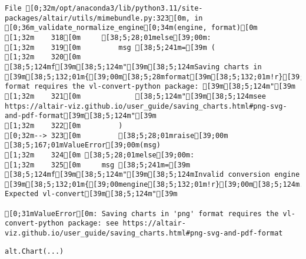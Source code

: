 \documentclass[
  letterpaper,
  DIV=11,
  numbers=noendperiod]{scrartcl}
\begin{document}
\begin{verbatim}
File [0;32m/opt/anaconda3/lib/python3.11/site-packages/altair/utils/mimebundle.py:323[0m, in [0;36m_validate_normalize_engine[0;34m(engine, format)[0m
[1;32m    318[0m     [38;5;28;01melse[39;00m:
[1;32m    319[0m         msg [38;5;241m=[39m (
[1;32m    320[0m             [38;5;124mf[39m[38;5;124m"[39m[38;5;124mSaving charts in [39m[38;5;132;01m{[39;00m[38;5;28mformat[39m[38;5;132;01m!r}[39;00m[38;5;124m format requires the vl-convert-python package: [39m[38;5;124m"[39m
[1;32m    321[0m             [38;5;124m"[39m[38;5;124msee https://altair-viz.github.io/user_guide/saving_charts.html#png-svg-and-pdf-format[39m[38;5;124m"[39m
[1;32m    322[0m         )
[0;32m--> 323[0m         [38;5;28;01mraise[39;00m [38;5;167;01mValueError[39;00m(msg)
[1;32m    324[0m [38;5;28;01melse[39;00m:
[1;32m    325[0m     msg [38;5;241m=[39m [38;5;124mf[39m[38;5;124m"[39m[38;5;124mInvalid conversion engine [39m[38;5;132;01m{[39;00mengine[38;5;132;01m!r}[39;00m[38;5;124m. Expected vl-convert[39m[38;5;124m"[39m

[0;31mValueError[0m: Saving charts in 'png' format requires the vl-convert-python package: see https://altair-viz.github.io/user_guide/saving_charts.html#png-svg-and-pdf-format
\end{verbatim}

\begin{verbatim}
alt.Chart(...)
\end{verbatim}
\end{document}

